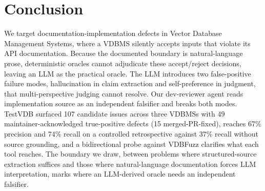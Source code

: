 \documentclass[sigconf]{acmart}
\begin{document}
\section{Conclusion}
\label{sec:concl}

We target documentation-implementation defects in Vector Database Management Systems, where a VDBMS silently accepts inputs that violate its API documentation. Because the documented boundary is natural-language prose, deterministic oracles cannot adjudicate these accept/reject decisions, leaving an LLM as the practical oracle. The LLM introduces two false-positive failure modes, hallucination in claim extraction and self-preference in judgment, that multi-perspective judging cannot resolve. Our dev-reviewer agent reads implementation source as an independent falsifier and breaks both modes. TestVDB surfaced 107 candidate issues across three VDBMSs with 49 maintainer-acknowledged true-positive defects (15 merged-PR-fixed), reaches 67\% precision and 74\% recall on a controlled retrospective against 37\% recall without source grounding, and a bidirectional probe against VDBFuzz clarifies what each tool reaches. The boundary we draw, between problems where structured-source extraction suffices and those where natural-language documentation forces LLM interpretation, marks where an LLM-derived oracle needs an independent falsifier.



\end{document}
